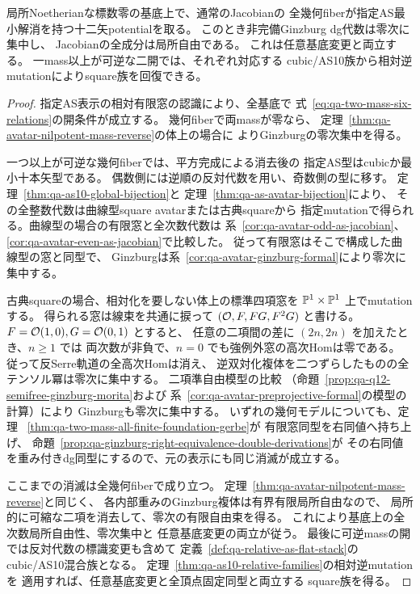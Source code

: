 \begin{theorem}[全mass配置での全次数平坦性と逆mutation]
\label{thm:qa-avatar-all-mass-fiberwise-flat}
局所Noetherianな標数零の基底上で、通常のJacobianの
全幾何fiberが指定AS最小解消を持つ十二矢potentialを取る。
このとき非完備Ginzburg dg代数は零次に集中し、
Jacobianの全成分は局所自由である。
これは任意基底変更と両立する。
一mass以上が可逆な二開では、それぞれ対応する
cubic/AS10族から相対逆mutationによりsquare族を回復できる。
\end{theorem}
\begin{proof}
指定AS表示の相対有限窓の認識により、全基底で
式~\eqref{eq:qa-two-mass-six-relations}の開条件が成立する。
幾何fiberで両massが零なら、
定理~\ref{thm:qa-avatar-nilpotent-mass-reverse}の体上の場合に
よりGinzburgの零次集中を得る。

一つ以上が可逆な幾何fiberでは、平方完成による消去後の
指定AS型はcubicか最小十本矢型である。
偶数側には逆順の反対代数を用い、奇数側の型に移す。
定理~\ref{thm:qa-as10-global-bijection}と
定理~\ref{thm:qa-as-avatar-bijection}により、
その全整数代数は曲線型square avatarまたは古典squareから
指定mutationで得られる。曲線型の場合の有限窓と全次数代数は
系~\ref{cor:qa-avatar-odd-as-jacobian}、
\ref{cor:qa-avatar-even-as-jacobian}で比較した。
従って有限窓はそこで構成した曲線型の窓と同型で、
Ginzburgは系~\ref{cor:qa-avatar-ginzburg-formal}により零次に集中する。

古典squareの場合、相対化を要しない体上の標準四項窓を
$\mathbb P^1\times\mathbb P^1$ 上でmutationする。
得られる窓は線束を共通に捩って
$(\mathcal O,F,FG,F^2G)$ と書ける。$F=\mathcal O(1,0),G=\mathcal O(0,1)$ とすると、
任意の二項間の差に $(2n,2n)$ を加えたとき、$n\ge1$ では
両次数が非負で、$n=0$ でも強例外窓の高次Homは零である。
従って反Serre軌道の全高次Homは消え、
逆双対化複体を二つずらしたものの全テンソル冪は零次に集中する。
二項準自由模型の比較
（命題~\ref{prop:qa-q12-semifree-ginzburg-morita}および
系~\ref{cor:qa-avatar-preprojective-formal}の模型の計算）により
Ginzburgも零次に集中する。
いずれの幾何モデルについても、定理~
\ref{thm:qa-two-mass-all-finite-foundation-gerbe}が
有限窓同型を右同値へ持ち上げ、
命題~\ref{prop:qa-ginzburg-right-equivalence-double-derivations}が
その右同値を重み付きdg同型にするので、元の表示にも同じ消滅が成立する。

ここまでの消滅は全幾何fiberで成り立つ。
定理~\ref{thm:qa-avatar-nilpotent-mass-reverse}と同じく、
各内部重みのGinzburg複体は有界有限局所自由なので、
局所的に可縮な二項を消去して、零次の有限自由束を得る。
これにより基底上の全次数局所自由性、零次集中と
任意基底変更の両立が従う。
最後に可逆massの開では反対代数の標識変更も含めて
定義~\ref{def:qa-relative-as-flat-stack}のcubic/AS10混合族となる。
定理~\ref{thm:qa-as10-relative-families}の相対逆mutationを
適用すれば、任意基底変更と全頂点固定同型と両立する
square族を得る。
\end{proof}

